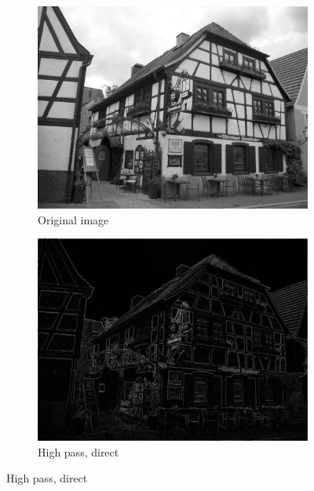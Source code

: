 \documentclass{beamer}
\begin{document}
\begin{frame}
\begin{figure}[h] \centering 
\begin{subfigure}[b]{0.35\textwidth} \includegraphics[width=\textwidth]{house_original.png} \caption{Original image} %
\end{subfigure}
\begin{subfigure}[b]{0.35\textwidth} \includegraphics[width=\textwidth]{house_direct.png} \caption{High pass, direct}\end{subfigure}


\end{figure}
\end{frame}
\end{document}
